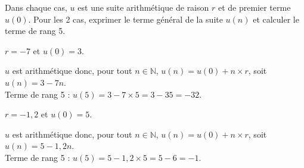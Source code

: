 \documentclass[11pt,a4paper]{article}  %
\begin{document}
Dans chaque cas, $u$ est une suite arithmétique de raison $r$ et de premier terme $u(0)$. Pour les 2 cas, exprimer le terme général de la suite $u(n)$ et calculer le terme de rang 5.
\begin{enumMet}
	\item $r=-7$ et $u(0)=3$.
	\par
	\begin{corrBox}
		$u$ est arithmétique donc, pour tout $n\in\mathbb{N}$, $u(n)=u(0)+n\times r$, soit $u(n)=3-7n$.\\
		Terme de rang 5 : $u(5)=3-7\times 5=3-35=-32$.
	\end{corrBox}

	\item {} $r=-1,2$ et $u(0)=5$.
	\par
	\begin{corrBox}
		$u$ est arithmétique donc, pour tout $n\in\mathbb{N}$, $u(n)=u(0)+n\times r$, soit $u(n)=5-1,2n$.\\
		Terme de rang 5 : $u(5)=5-1,2\times 5=5-6=-1$.
	\end{corrBox}
\end{enumMet}
\end{document}
